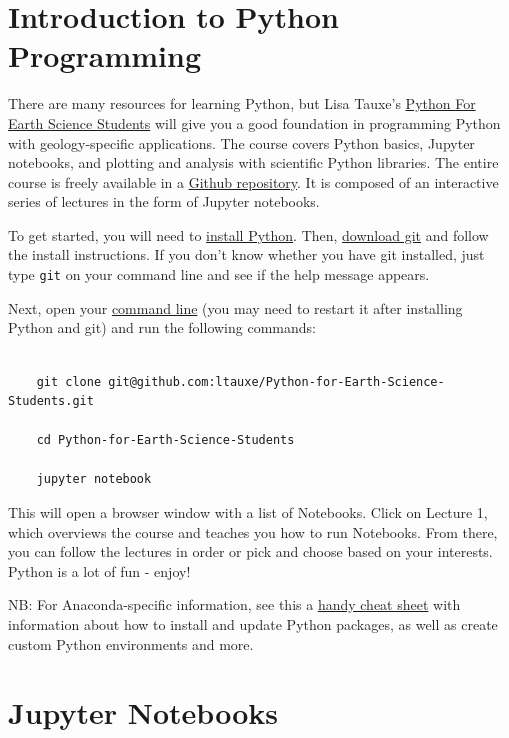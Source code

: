 \documentclass[11pt]{book}
\begin{document}
{{{
\chapter{Introduction to Python Programming}
\label{chap:python}

There are many resources for learning Python, but Lisa Tauxe's \href{https://github.com/ltauxe/Python-for-Earth-Science-Students}{Python For Earth Science Students} will give you a good foundation in programming Python with geology-specific applications.  The course covers Python basics, Jupyter notebooks, and plotting and analysis with scientific Python libraries.  The entire course is freely available in a \href{https://github.com/ltauxe/Python-for-Earth-Science-Students}{Github repository}.  It is composed of an interactive series of lectures in the form of Jupyter notebooks.

To get started, you will need to \href{#getting_python}{install Python}.  Then, \href{https://git-scm.com/downloads}{download git} and follow the install instructions.  If you don't know whether you have git installed, just type \verb!git! on your command line and see if the help message appears.

Next, open your \href{#command_line}{command line} (you may need to restart it after installing Python and git) and run the following commands:  \begin{verbatim}

    git clone git@github.com:ltauxe/Python-for-Earth-Science-Students.git

    cd Python-for-Earth-Science-Students

    jupyter notebook
\end{verbatim}
This will open a browser window with a list of Notebooks.  Click on Lecture 1, which overviews the course and teaches you how to run Notebooks.  From there, you can follow the lectures in order or pick and choose based on your interests. Python is a lot of fun - enjoy!

NB: For Anaconda-specific information, see this a \href{https://conda.io/docs/_downloads/conda-cheatsheet.pdf}{handy cheat sheet} with information about how to install and update Python packages, as well as create custom Python environments and more.

\chapter{Jupyter Notebooks}
\label{chap:notebooks}

}}}
\end{document}

